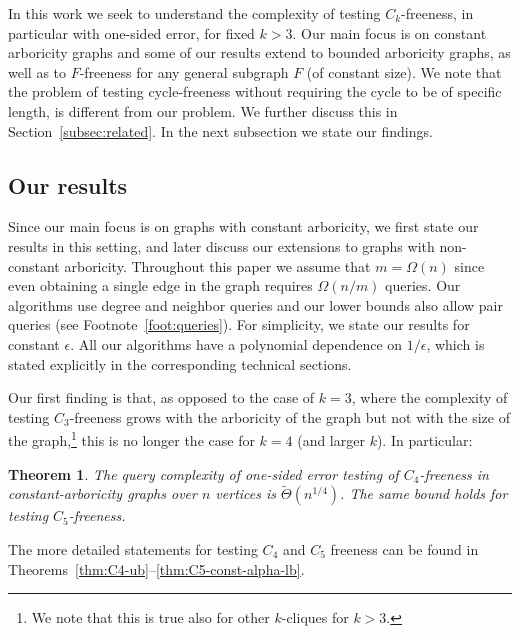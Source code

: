 \documentclass{article}
\newcommand{\eps}{\epsilon}
\newtheorem{theorem}{Theorem}
\begin{document}
In this work we seek to understand the complexity of testing $C_k$-freeness, in particular with one-sided error, for fixed $k> 3$. Our main focus is on constant arboricity graphs and some of our results extend to bounded arboricity graphs, as well as to $F$-freeness for any general subgraph $F$ (of constant size). 
We note that the problem of testing cycle-freeness
without requiring the cycle to be of specific length, is  different from our problem. We further discuss this in Section~\ref{subsec:related}.
In the next subsection we state our findings.



\subsection{Our results}

Since our main focus is on graphs with constant arboricity, we first state our results in this setting, and later discuss our extensions to graphs with non-constant arboricity.
Throughout this paper we assume that $m = \Omega(n)$ since  %
even obtaining a single edge in the graph requires $\Omega(n/m)$ queries. 
Our algorithms use degree and neighbor queries and our lower bounds also allow pair queries (see Footnote~\ref{foot:queries}).
For simplicity, we state our results for constant $\epsilon$. All our algorithms have a polynomial dependence on $1/\eps$, which is stated explicitly in the corresponding technical sections.




Our first finding is that, as opposed to the case of $k=3$, where the complexity of testing $C_3$-freeness grows with the arboricity of the graph but not with the size of the graph,\footnote{We note that this is true also for other $k$-cliques for $k > 3$.} this is no longer the case for $k=4$ (and larger $k$). In particular: 


\begin{theorem}\label{thm:C4-5}
The query complexity of one-sided error testing of $C_4$-freeness in constant-arboricity graphs over $n$ vertices is $\widetilde{\Theta}(n^{1/4})$.
The same bound holds for testing $C_5$-freeness.
\end{theorem}

 The more detailed statements for testing $C_4$ and $C_5$ freeness 
can be found in Theorems~\ref{thm:C4-ub}--\ref{thm:C5-const-alpha-lb}.
\end{document}

